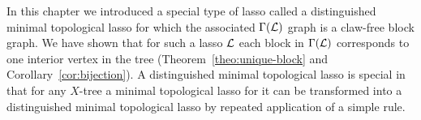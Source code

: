 In this chapter we introduced a special type of lasso called a distinguished
minimal topological lasso for which the associated $\Gamma({\mathcal L})$ graph is a
claw-free block graph.  We have shown that for such a lasso ${\mathcal L}$ each block
in $\Gamma({\mathcal L})$ corresponds to one interior vertex in the tree
(Theorem~\ref{theo:unique-block} and Corollary~\ref{cor:bijection}).  A
distinguished minimal topological lasso is special in that for any $X$-tree a
minimal topological lasso for it can be transformed into a distinguished
minimal topological lasso by repeated application of a simple rule.  

